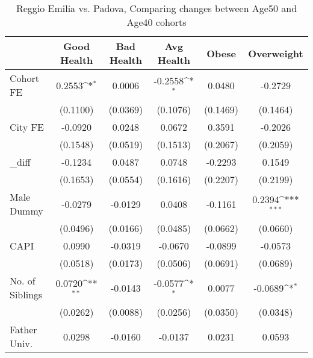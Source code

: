 \begin{table}[htbp]\centering
\def\sym#1{\ifmmode^{#1}\else\(^{#1}\)\fi}
\caption{Reggio Emilia vs. Padova, Comparing changes between Age50 and Age40 cohorts}
\begin{tabular}{l*{5}{c}}
\toprule
            &\multicolumn{1}{c}{Good Health}&\multicolumn{1}{c}{Bad Health}&\multicolumn{1}{c}{Avg Health}&\multicolumn{1}{c}{Obese}&\multicolumn{1}{c}{Overweight}\\
\midrule
Cohort FE   &      0.2553\sym{*}  &      0.0006         &     -0.2558\sym{*}  &      0.0480         &     -0.2729         \\
            &    (0.1100)         &    (0.0369)         &    (0.1076)         &    (0.1469)         &    (0.1464)         \\
\addlinespace
City FE     &     -0.0920         &      0.0248         &      0.0672         &      0.3591         &     -0.2026         \\
            &    (0.1548)         &    (0.0519)         &    (0.1513)         &    (0.2067)         &    (0.2059)         \\
\addlinespace
\_diff       &     -0.1234         &      0.0487         &      0.0748         &     -0.2293         &      0.1549         \\
            &    (0.1653)         &    (0.0554)         &    (0.1616)         &    (0.2207)         &    (0.2199)         \\
\addlinespace
Male Dummy  &     -0.0279         &     -0.0129         &      0.0408         &     -0.1161         &      0.2394\sym{***}\\
            &    (0.0496)         &    (0.0166)         &    (0.0485)         &    (0.0662)         &    (0.0660)         \\
\addlinespace
CAPI        &      0.0990         &     -0.0319         &     -0.0670         &     -0.0899         &     -0.0573         \\
            &    (0.0518)         &    (0.0173)         &    (0.0506)         &    (0.0691)         &    (0.0689)         \\
\addlinespace
No. of Siblings&      0.0720\sym{**} &     -0.0143         &     -0.0577\sym{*}  &      0.0077         &     -0.0689\sym{*}  \\
            &    (0.0262)         &    (0.0088)         &    (0.0256)         &    (0.0350)         &    (0.0348)         \\
\addlinespace
Father Univ.&      0.0298         &     -0.0160         &     -0.0137         &      0.0231         &      0.0593         \\

\end{tabular}
\end{table}
